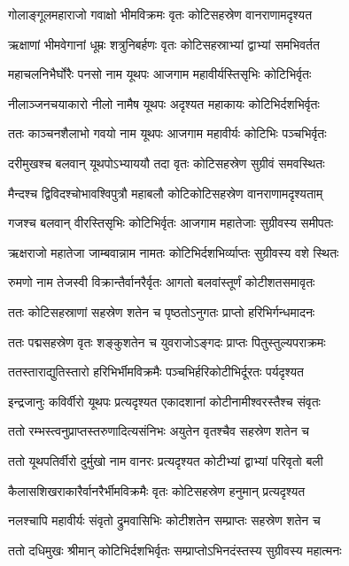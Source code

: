 \twolineshloka
{गोलाङ्गूलमहाराजो गवाक्षो भीमविक्रमः}
{वृतः कोटिसहस्रेण वानराणामदृश्यत} %

\twolineshloka
{ऋक्षाणां भीमवेगानां धूम्रः शत्रुनिबर्हणः}
{वृतः कोटिसहस्राभ्यां द्वाभ्यां समभिवर्तत} %

\twolineshloka
{महाचलनिभैर्घोरैः पनसो नाम यूथपः}
{आजगाम महावीर्यस्तिसृभिः कोटिभिर्वृतः} %

\twolineshloka
{नीलाञ्जनचयाकारो नीलो नामैष यूथपः}
{अदृश्यत महाकायः कोटिभिर्दशभिर्वृतः} %

\twolineshloka
{ततः काञ्चनशैलाभो गवयो नाम यूथपः}
{आजगाम महावीर्यः कोटिभिः पञ्चभिर्वृतः} %

\twolineshloka
{दरीमुखश्च बलवान् यूथपोऽभ्याययौ तदा}
{वृतः कोटिसहस्रेण सुग्रीवं समवस्थितः} %

\twolineshloka
{मैन्दश्च द्विविदश्चोभावश्विपुत्रौ महाबलौ}
{कोटिकोटिसहस्रेण वानराणामदृश्यताम्} %

\twolineshloka
{गजश्च बलवान् वीरस्तिसृभिः कोटिभिर्वृतः}
{आजगाम महातेजाः सुग्रीवस्य समीपतः} %

\twolineshloka
{ऋक्षराजो महातेजा जाम्बवान्नाम नामतः}
{कोटिभिर्दशभिर्व्याप्तः सुग्रीवस्य वशे स्थितः} %

\twolineshloka
{रुमणो नाम तेजस्वी विक्रान्तैर्वानरैर्वृतः}
{आगतो बलवांस्तूर्णं कोटीशतसमावृतः} %

\twolineshloka
{ततः कोटिसहस्राणां सहस्रेण शतेन च}
{पृष्ठतोऽनुगतः प्राप्तो हरिभिर्गन्धमादनः} %

\twolineshloka
{ततः पद्मसहस्रेण वृतः शङ्कुशतेन च}
{युवराजोऽङ्गदः प्राप्तः पितुस्तुल्यपराक्रमः} %

\twolineshloka
{ततस्ताराद्युतिस्तारो हरिभिर्भीमविक्रमैः}
{पञ्चभिर्हरिकोटीभिर्दूरतः पर्यदृश्यत} %

\twolineshloka
{इन्द्रजानुः कविर्वीरो यूथपः प्रत्यदृश्यत}
{एकादशानां कोटीनामीश्वरस्तैश्च संवृतः} %

\twolineshloka
{ततो रम्भस्त्वनुप्राप्तस्तरुणादित्यसंनिभः}
{अयुतेन वृतश्चैव सहस्रेण शतेन च} %

\twolineshloka
{ततो यूथपतिर्वीरो दुर्मुखो नाम वानरः}
{प्रत्यदृश्यत कोटीभ्यां द्वाभ्यां परिवृतो बली} %

\twolineshloka
{कैलासशिखराकारैर्वानरैर्भीमविक्रमैः}
{वृतः कोटिसहस्रेण हनुमान् प्रत्यदृश्यत} %

\twolineshloka
{नलश्चापि महावीर्यः संवृतो द्रुमवासिभिः}
{कोटीशतेन सम्प्राप्तः सहस्रेण शतेन च} %

\twolineshloka
{ततो दधिमुखः श्रीमान् कोटिभिर्दशभिर्वृतः}
{सम्प्राप्तोऽभिनदंस्तस्य सुग्रीवस्य महात्मनः} %

